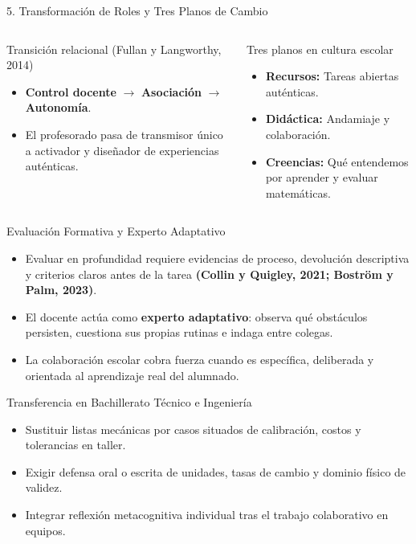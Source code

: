 \documentclass[aspectratio=169,spanish,xcolor=table]{beamer}
\begin{document}
\begin{frame}{5. Transformación de Roles y Tres Planos de Cambio}
  \begin{columns}[T]
      \begin{block}{Transición relacional (Fullan y Langworthy, 2014)}
        \begin{itemize}\scriptsize
          \item \textbf{Control docente} $\rightarrow$ \textbf{Asociación} $\rightarrow$ \textbf{Autonomía}.
          \item El profesorado pasa de transmisor único a activador y diseñador de experiencias auténticas.
        \end{itemize}
      \end{block}
      \begin{block}{Tres planos en cultura escolar}
        \begin{itemize}\scriptsize
          \item \textbf{Recursos:} Tareas abiertas auténticas.
          \item \textbf{Didáctica:} Andamiaje y colaboración.
          \item \textbf{Creencias:} Qué entendemos por aprender y evaluar matemáticas.
        \end{itemize}
      \end{block}
  \end{columns}
\end{frame}

\begin{frame}{Evaluación Formativa y Experto Adaptativo}
  \begin{itemize}\normalsize
    \item Evaluar en profundidad requiere evidencias de proceso, devolución descriptiva y criterios claros antes de la tarea \textbf{(Collin y Quigley, 2021; Boström y Palm, 2023)}.
    \item El docente actúa como \textbf{experto adaptativo}: observa qué obstáculos persisten, cuestiona sus propias rutinas e indaga entre colegas.
    \item La colaboración escolar cobra fuerza cuando es específica, deliberada y orientada al aprendizaje real del alumnado.
  \end{itemize}
\end{frame}

\begin{frame}{Transferencia en Bachillerato Técnico e Ingeniería}
  \begin{itemize}\normalsize
    \item Sustituir listas mecánicas por casos situados de calibración, costos y tolerancias en taller.
    \item Exigir defensa oral o escrita de unidades, tasas de cambio y dominio físico de validez.
    \item Integrar reflexión metacognitiva individual tras el trabajo colaborativo en equipos.
  \end{itemize}
\end{frame}
\end{document}

